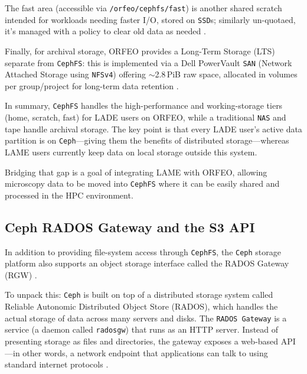 The fast area (accessible via \texttt{/orfeo/cephfs/fast}) is another shared 
scratch intended for workloads needing faster I/O, stored on \texttt{SSD}s; 
similarly un-quotaed, it’s managed with a policy to clear old data as 
needed \parencite{ORFEO_Docs_Storage}. 

Finally, for archival storage, ORFEO provides a Long-Term Storage (LTS) 
separate from \texttt{CephFS}: this is implemented via a Dell PowerVault 
\texttt{SAN} (Network Attached Storage using \texttt{NFSv4}) offering 
$\sim$2.8\,PiB raw space, allocated in volumes per group/project for long-term 
data retention \parencite{ORFEO_Docs_Storage}.

\medskip

In summary, \texttt{CephFS} handles the high-performance and working-storage 
tiers (home, scratch, fast) for LADE users on ORFEO, while a traditional 
\texttt{NAS} and tape handle archival storage. The key point is that every LADE 
user’s active data partition is on \texttt{Ceph}—giving them the benefits of 
distributed storage—whereas LAME users currently keep data on local storage 
outside this system. 

Bridging that gap is a goal of integrating LAME with ORFEO, allowing microscopy 
data to be moved into \texttt{CephFS} where it can be easily shared and 
processed in the HPC environment.


\subsection{Ceph RADOS Gateway and the S3 API}

In addition to providing file-system access through \texttt{CephFS}, the 
\texttt{Ceph} storage platform also supports an object storage interface called 
the RADOS Gateway (RGW) \parencite{Ceph_RGW_Overview}.

\medskip

To unpack this: \texttt{Ceph} is built on top of a distributed storage system 
called Reliable Autonomic Distributed Object Store (RADOS), which handles the 
actual storage of data across many servers and disks. The \texttt{RADOS Gateway} 
is a service (a daemon called \texttt{radosgw}) that runs as an HTTP server. 
Instead of presenting storage as files and directories, the gateway exposes a 
web-based API—in other words, a network endpoint that applications can talk to 
using standard internet protocols \parencite{Ceph_RGW_Overview,Ceph_RGW_S3}.

\medskip

